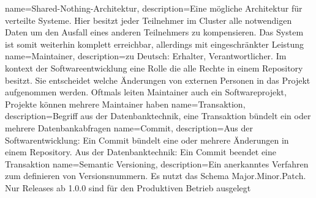 {
  name=Shared-Nothing-Architektur,
  description={Eine mögliche Architektur für verteilte Systeme. Hier besitzt
               jeder Teilnehmer im Cluster alle notwendigen Daten um den
               Ausfall eines anderen Teilnehmers zu kompensieren. Das
               System ist somit weiterhin komplett erreichbar, allerdings mit
               eingeschränkter Leistung}
}
{
  name=Maintainer,
  description={zu Deutsch: Erhalter, Verantwortlicher. Im kontext der
               Softwareentwicklung eine Rolle die alle Rechte in einem
               \gls{Repository} besitzt. Sie entscheidet welche Änderungen von
               externen Personen in das Projekt aufgenommen werden. Oftmals
               leiten Maintainer auch ein Softwareprojekt, Projekte können
               mehrere Maintainer haben}
}
{
  name=Transaktion,
  description={Begriff aus der Datenbanktechnik, eine Transaktion bündelt ein
               oder mehrere Datenbankabfragen}
}
{
  name=Commit,
  description={Aus der Softwarentwicklung: Ein Commit bündelt eine oder mehrere
               Änderungen in einem \gls{Repository}. Aus der Datenbanktechnik:
               Ein Commit beendet eine \gls{Transaktion}}
}
{
  name={Semantic Versioning},
  description={Ein anerkanntes Verfahren zum definieren von Versionsnummern. Es
               nutzt das Schema Major.Minor.Patch. Nur Releases ab 1.0.0 sind
               für den Produktiven Betrieb ausgelegt~\cite{semver}}
}
